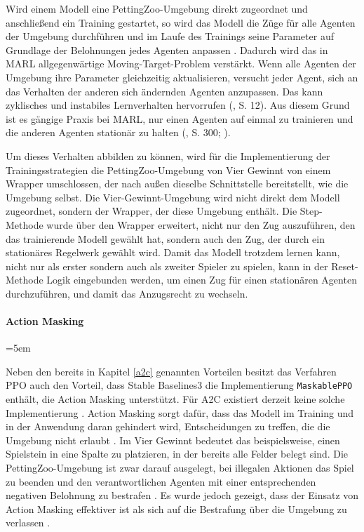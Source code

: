 Wird einem Modell eine PettingZoo-Umgebung direkt zugeordnet und anschließend ein Training gestartet, so wird das Modell die Züge für alle Agenten der Umgebung durchführen und im Laufe des Trainings seine Parameter auf Grundlage der Belohnungen jedes Agenten anpassen \cite{Farama.2025}. Dadurch wird das in MARL allgegenwärtige Moving-Target-Problem verstärkt. Wenn alle Agenten der Umgebung ihre Parameter gleichzeitig aktualisieren, versucht jeder Agent, sich an das Verhalten der anderen sich ändernden Agenten anzupassen. Das kann zyklisches und instabiles Lernverhalten hervorrufen (\cite{Albrecht.2024}, S. 12). Aus diesem Grund ist es gängige Praxis bei MARL, nur einen Agenten auf einmal zu trainieren und die anderen Agenten stationär zu halten (\cite{Albrecht.2024}, S. 300; \cite{Zhong.2020}).

Um dieses Verhalten abbilden zu können, wird für die Implementierung der Trainingsstrategien die PettingZoo-Umgebung von Vier Gewinnt von einem Wrapper umschlossen, der nach außen dieselbe Schnittstelle bereitstellt, wie die Umgebung selbst. Die Vier-Gewinnt-Umgebung wird nicht direkt dem Modell zugeordnet, sondern der Wrapper, der diese Umgebung enthält. Die Step-Methode wurde über den Wrapper erweitert, nicht nur den Zug auszuführen, den das trainierende Modell gewählt hat, sondern auch den Zug, der durch ein stationäres Regelwerk gewählt wird. Damit das Modell trotzdem lernen kann, nicht nur als erster sondern auch als zweiter Spieler zu spielen, kann in der Reset-Methode Logik eingebunden werden, um einen Zug für einen stationären Agenten durchzuführen, und damit das Anzugsrecht zu wechseln.

\paragraph{Action Masking}

\begingroup
\emergencystretch=5em

Neben den bereits in Kapitel \ref{a2c} genannten Vorteilen besitzt das Verfahren PPO auch den Vorteil, dass Stable Baselines3 die Implementierung \texttt{MaskablePPO} enthält, die Action Masking unterstützt. Für A2C existiert derzeit keine solche Implementierung \cite{Raffin.2021}. Action Masking sorgt dafür, dass das Modell im Training und in der Anwendung daran gehindert wird, Entscheidungen zu treffen, die die Umgebung nicht erlaubt \cite{Huang_2022}. Im Vier Gewinnt bedeutet das beispielsweise, einen Spielstein in eine Spalte zu platzieren, in der bereits alle Felder belegt sind. Die PettingZoo-Umgebung ist zwar darauf ausgelegt, bei illegalen Aktionen das Spiel zu beenden und den verantwortlichen Agenten mit einer entsprechenden negativen Belohnung zu bestrafen \cite{Farama.2025}. Es wurde jedoch gezeigt, dass der Einsatz von Action Masking effektiver ist als sich auf die Bestrafung über die Umgebung zu verlassen \cite{Huang_2022}.

